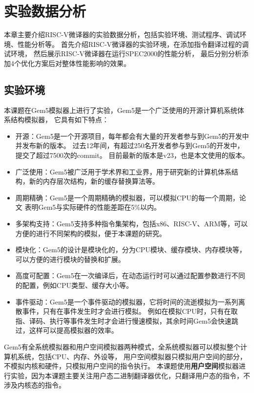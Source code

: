 \chapter{实验数据分析}\label{chap:Epxeriment}

本章主要介绍RISC-V微译器的实验数据分析，包括实验环境、测试程序、调试环境、性能分析等。
首先介绍RISC-V微译器的实验环境，在添加指令翻译过程的调试环境，
然后展示RISC-V微译器在运行SPEC2000的性能分析，
最后分别分析添加4个优化方案后对整体性能影响的效果。

\section{实验环境}

本课题在Gem5模拟器\cite{gem5OriginalPaper}上进行了实验，Gem5是一个广泛使用的开源计算机系统体系结构模拟器，
它具有如下特点：
\begin{itemize}
  \item 开源：Gem5是一个开源项目，每年都会有大量的开发者参与到Gem5的开发中并发布新的版本。
  过去12年间，有超过250名开发者参与到Gem5的开发中，提交了超过7500次的commit\cite{Gem5SimulatorVersion2020}。
  目前最新的版本是v23，也是本文使用的版本。
  \item 广泛使用：Gem5被广泛用于学术界和工业界，用于研究新的计算机体系结构，新的内存层次结构，新的缓存替换算法等。
  \item 周期精确：Gem5是一个周期精确的模拟器，可以模拟CPU的每一个周期，论文\cite{Butko2012AccuracyEO}
  表明Gem5与实际硬件的性能差距在5\%以内。
  \item 多架构支持：Gem5支持多种指令集架构，包括x86、RISC-V、ARM等，可以方便的进行不同架构的模拟，便于本课题的研究。
  \item 模块化：Gem5的设计是模块化的，分为CPU模块、缓存模块、内存模块等，可以方便的进行模块的替换和扩展。
  \item 高度可配置：Gem5在一次编译后，在动态运行时可以通过配置参数进行不同的配置，例如CPU类型、缓存大小等。
  \item 事件驱动：Gem5是一个事件驱动的模拟器，它将时间的流逝模拟为一系列离散事件，只有在事件发生时才会进行模拟。
  例如在模拟CPU时，只有在取指、译码、执行等事件发生时才会进行慢速模拟，其余时间Gem5会快速跳过，这样可以提高模拟器的效率。
\end{itemize}

Gem5有全系统模拟器和用户空间模拟器两种模式，全系统模拟器可以模拟整个计算机系统，包括CPU、内存、外设等，
用户空间模拟器只模拟用户空间的部分，不模拟内核和硬件，只模拟用户空间的指令执行\cite{gem5OriginalPaper}。
本课题使用\textbf{用户空间}模拟器进行实验，因为本课题主要关注用户态二进制翻译器优化，只翻译用户态的指令，不涉及内核态的指令。

